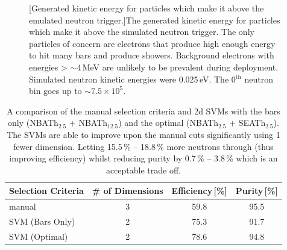 \begin{figure}[!h]
\begin{minipage}{.45\textwidth}
  [Generated kinetic energy for particles which make it above the emulated neutron trigger.]{The generated kinetic energy for particles which make it above the simulated neutron trigger. The only particles of concern are electrons that produce high enough energy to hit many bars and produce showers. Background electrons with energies > $\sim$4\,MeV are unlikely to be prevalent during deployment. Simulated neutron kinetic energies were 0.025\,eV. The 0$^\textrm{th}$ neutron bin goes up to $\sim 7.5 \times 10^5$.}
  \label{fig:GeneratedEnergyPastTriggerGdDicebox}
\end{minipage}
\end{figure}

\begin{table}[!h]
\centering
\begin{tabular}{lccc}  
\toprule
Selection Criteria & \# of Dimensions & Efficiency\,[\%] & Purity\,[\%] \\
\midrule
manual            & 3                & 59.8             & 95.5         \\
SVM (Bars Only)    & 2                & 75.3             & 91.7         \\
SVM (Optimal)      & 2                & 78.6             & 94.8         \\
\bottomrule  
\end{tabular}
\caption{A comparison of the manual selection criteria and 2d SVMs with the bars only (NBATh$_{2.5}$ + NBATh$_{12.5}$) and the optimal (NBATh$_{2.5}$ + SEATh$_{2.5}$). The SVMs are able to improve upon the manual cuts significantly using 1 fewer dimension. Letting 15.5\,\% -- 18.8\,\% more neutrons through (thus improving efficiency) whilst reducing purity by 0.7\,\% -- 3.8\,\% which is an acceptable trade off.}
\label{tab:svmSelection}
\end{table}

